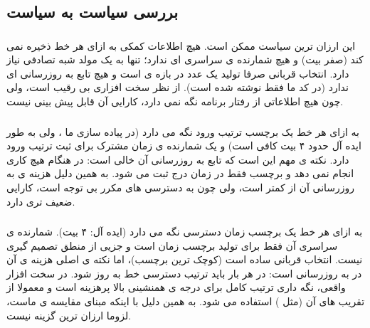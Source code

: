 \documentclass[12pt,a4paper]{article}
\begin{document}
\subsection{بررسی سیاست به سیاست}

\subsubsection{}

این ارزان ترین سیاست ممکن است. هیچ اطلاعات کمکی به ازای هر خط ذخیره نمی کند (صفر بیت) و هیچ شمارنده ی سراسری ای ندارد؛ تنها به یک مولد شبه تصادفی نیاز دارد. انتخاب قربانی صرفا تولید یک عدد در بازه ی \lr{\texttt{[0, ways-1]}} است و هیچ تابع به روزرسانی ای ندارد (در کد ما فقط  نوشته شده است). از نظر سخت افزاری بی رقیب است، ولی چون هیچ اطلاعاتی از رفتار برنامه نگه نمی دارد، کارایی آن قابل پیش بینی نیست.

\subsubsection{}

به ازای هر خط یک برچسب ترتیب ورود نگه می دارد (در پیاده سازی ما ، ولی به طور ایده آل حدود ۴ بیت کافی است) و یک شمارنده ی زمان مشترک برای ثبت ترتیب ورود دارد. نکته ی مهم این است که تابع به روزرسانی آن خالی است: در هنگام  هیچ کاری انجام نمی دهد و برچسب فقط در زمان درج ثبت می شود. به همین دلیل هزینه ی به روزرسانی آن از  کمتر است، ولی چون به دسترسی های مکرر بی توجه است، کارایی ضعیف تری دارد.

\subsubsection{}

به ازای هر خط یک برچسب زمان دسترسی نگه می دارد (ایده آل: ۴ بیت). شمارنده ی سراسری آن فقط برای تولید برچسب زمان است و جزیی از منطق تصمیم گیری نیست. انتخاب قربانی ساده است (کوچک ترین برچسب)، اما نکته ی اصلی هزینه ی آن در به روزرسانی است: در هر بار  باید ترتیب دسترسی خط به روز شود. در سخت افزار واقعی، نگه داری ترتیب کامل  برای درجه ی همنشینی بالا پرهزینه است و معمولا از تقریب های آن (مثل ) استفاده می شود. به همین دلیل  با اینکه مبنای مقایسه ی ماست، لزوما ارزان ترین گزینه نیست.

\subsubsection{}
\end{document}

